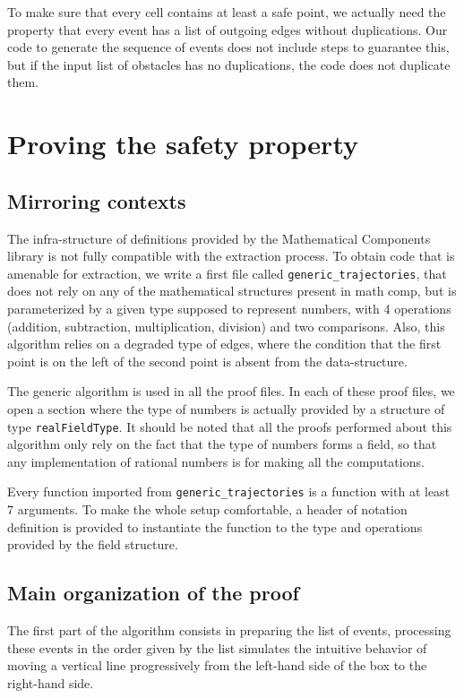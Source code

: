 \documentclass[a4paper, USenglish, cleveref, autoref, thm-restate]{lipics-v2021}
\begin{document}
To make sure that every cell contains at least a safe point, we
actually need the property that every event has a list of outgoing
edges without duplications.  Our code to generate the sequence of
events does not include steps to guarantee this, but if the input
list of obstacles has no duplications, the code does not duplicate them.

\section{Proving the safety property}
\subsection{Mirroring contexts}
The infra-structure of definitions provided by the Mathematical
Components library is not fully compatible with the extraction
process.  To obtain code that is amenable for extraction, we write a
first file called {\tt generic\_trajectories}, that does not rely on
any of the mathematical structures present in math comp, but is
parameterized by a given type supposed to represent numbers, with 4
operations (addition, subtraction, multiplication, division) and two
comparisons.  Also, this algorithm relies on a degraded type of edges,
where the condition that the first point is on the left of the second
point is absent from the data-structure.

The generic algorithm is used in all the proof files.  In each of
these proof files, we open a section where the type of numbers is
actually provided by a structure of type {\tt realFieldType}.  It
should be noted that all the proofs performed about this algorithm
only rely on the fact that the type of numbers forms a field, so that
any implementation of rational numbers is for making all the
computations.

Every function imported from {\tt generic\_trajectories} is a function
with at least 7 arguments.  To make the whole setup comfortable, a
header of notation definition is provided to instantiate the function
to the type and operations provided by the field structure.


\subsection{Main organization of the proof}
The first part of the algorithm consists in preparing the list of
events, processing these events in the order given by the list
simulates the intuitive behavior of moving a vertical line
progressively from the left-hand side of the box to the right-hand
side.
\end{document}
